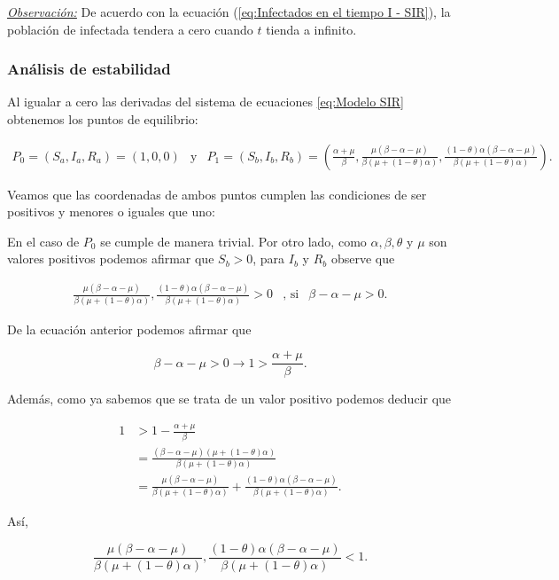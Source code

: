 \underline{\textit{Observación:}} De acuerdo con la ecuación (\ref{eq:Infectados en el tiempo I - SIR}), la población de infectada tendera a cero cuando $t$ tienda a infinito.

\subsubsection{Análisis de estabilidad}

Al igualar a cero las derivadas del sistema de ecuaciones \ref{eq:Modelo SIR} obtenemos los puntos de equilibrio:

$$\begin{array}{ccc}
P_0=(S_a,I_a,R_a)=(1,0,0) & \text{y} & P_1=(S_b,I_b,R_b)=\left(\frac{\alpha+\mu}{\beta},\frac{\mu(\beta-\alpha-\mu)}{\beta(\mu+(1-\theta)\alpha)},\frac{(1-\theta)\alpha(\beta-\alpha-\mu)}{\beta(\mu+(1-\theta)\alpha)}\right).
\end{array}$$

Veamos que las coordenadas de ambos puntos cumplen las condiciones de ser positivos y menores o iguales que uno: 

En el caso de $P_0$ se cumple de manera trivial. Por otro lado, como $\alpha,\beta,\theta$ y $\mu$ son valores positivos podemos afirmar que $S_b>0$, para $I_b$ y $R_b$ observe que 

$$\begin{array}{ccc}
\frac{\mu(\beta-\alpha-\mu)}{\beta(\mu+(1-\theta)\alpha)},\frac{(1-\theta)\alpha(\beta-\alpha-\mu)}{\beta(\mu+(1-\theta)\alpha)}>0 & \text{, si} & \beta-\alpha-\mu>0.
\end{array}$$

De la ecuación anterior podemos afirmar que 

$$\beta-\alpha-\mu>0\longrightarrow1>\frac{\alpha+\mu}{\beta}.$$

Además, como ya sabemos que se trata de un valor positivo podemos deducir que 

\begin{align*}
1&>1-\frac{\alpha+\mu}{\beta} \\
&= \frac{(\beta-\alpha-\mu)(\mu+(1-\theta)\alpha)}{\beta(\mu+(1-\theta)\alpha)}\\
&= \frac{\mu(\beta-\alpha-\mu)}{\beta(\mu+(1-\theta)\alpha)}+\frac{(1-\theta)\alpha(\beta-\alpha-\mu)}{\beta(\mu+(1-\theta)\alpha)}.
\end{align*}

Así,

$$\frac{\mu(\beta-\alpha-\mu)}{\beta(\mu+(1-\theta)\alpha)},\frac{(1-\theta)\alpha(\beta-\alpha-\mu)}{\beta(\mu+(1-\theta)\alpha)}<1.$$

